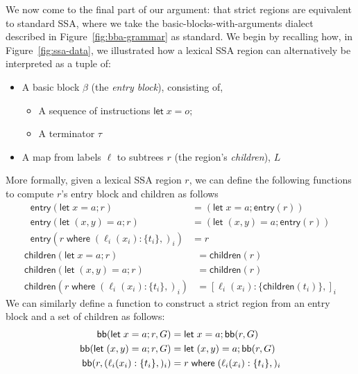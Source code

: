 \documentclass[acmsmall,screen,review]{acmart}
\newcommand{\ms}[1]{\ensuremath{\mathsf{#1}}}
\newcommand{\lto}{:}
\newcommand{\letstmt}[3]{\ensuremath{\ms{let}\;#1 = #2; #3}}
\newcommand{\where}[2]{#1\;\ms{where}\;#2}
\newcommand{\wbranch}[3]{#1(#2) \lto \{#3\}}
\newcommand{\toentry}[1]{\ms{entry}(#1)}
\newcommand{\todom}[1]{\ms{children}(#1)}
\newcommand{\adddom}[2]{\ms{bb}(#1, #2)}
\begin{document}
We now come to the final part of our argument: that strict regions are equivalent to standard SSA,
where we take the basic-blocks-with-arguments dialect described in Figure~\ref{fig:bba-grammar} as
standard. We begin by recalling how, in Figure~\ref{fig:ssa-data}, we illustrated how a lexical SSA
region can alternatively be interpreted as a tuple of: 
\begin{itemize}
  \item A basic block $\beta$ (the \emph{entry block}), consisting of,
  \begin{itemize}
    \item A sequence of instructions $\letstmt{x}{o}{}$
    \item A terminator $\tau$
  \end{itemize}
  \item A map from labels $\ell$ to subtrees $r$ (the region's \emph{children}), $L$
\end{itemize}
More formally, given a lexical SSA region $r$, we can define the following functions to compute
$r$'s entry block and children as follows
\begin{equation}
  \begin{aligned}
    \toentry{\letstmt{x}{a}{r}} &= (\letstmt{x}{a}{\toentry{r}}) \\
    \toentry{\letstmt{(x, y)}{a}{r}} &= (\letstmt{(x, y)}{a}{\toentry{r}}) \\
    \toentry{\where{r}{(\wbranch{\ell_i}{x_i}{t_i},)_i}} &= r
  \end{aligned}
\end{equation}
\begin{equation}
  \begin{aligned}
    \todom{\letstmt{x}{a}{r}} &= \todom{r} \\
    \todom{\letstmt{(x, y)}{a}{r}} &= \todom{r} \\
    \todom{\where{r}{(\wbranch{\ell_i}{x_i}{t_i},)_i}} &= [\wbranch{\ell_i}{x_i}{\todom{t_i}},]_i
  \end{aligned}
\end{equation}
We can similarly define a function to construct a strict region from an entry block and a set
of children as follows:
\begin{equation}
  \begin{aligned}
  \adddom{\letstmt{x}{a}{r}}{G} &= \letstmt{x}{a}{\adddom{r}}{G} \\
  \adddom{\letstmt{(x, y)}{a}{r}}{G} &= \letstmt{(x, y)}{a}{\adddom{r}}{G} \\
  \adddom{r}{(\wbranch{\ell_i}{x_i}{t_i},)_i} &= \where{r}{(\wbranch{\ell_i}{x_i}{t_i},)_i}
  \end{aligned}
\end{equation}
\end{document}
